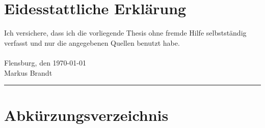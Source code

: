\documentclass[a4paper,12pt,makeidx,numbers=noenddot]{scrreprt}
\begin{document}
	
\pagestyle{empty}

			

\cleardoubleoddpage	


\chapter*{Eidesstattliche Erklärung}
Ich versichere, dass ich die vorliegende Thesis ohne fremde Hilfe selbstständig verfasst und nur die angegebenen Quellen benutzt habe. \\~\\
Flensburg, den \today\\[.6cm]
Markus Brandt\\
\rule[0.5em]{20em}{0.5pt}



\tableofcontents			%
\listoffigures				%
\listoftables				%
\chapter*{Abkürzungsverzeichnis}
\begin{acronym}[4GDH]	%
\end{acronym}

\pagestyle{fancy}







\newpage
\lhead{}
\rhead{\leftmark}


\appendix			%

\end{document}
